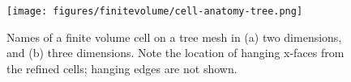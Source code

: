 \begin{figure}[ht]
    \centering
    \texttt{[image: figures/finitevolume/cell-anatomy-tree.png]}
    \caption{Names of a finite volume cell on a tree mesh in (a) two dimensions, and (b) three dimensions. Note the location of hanging x-faces from the refined cells; hanging edges are not shown.}
    \label{fig:finitevolume-cell-anatomy-tree}
\end{figure}
